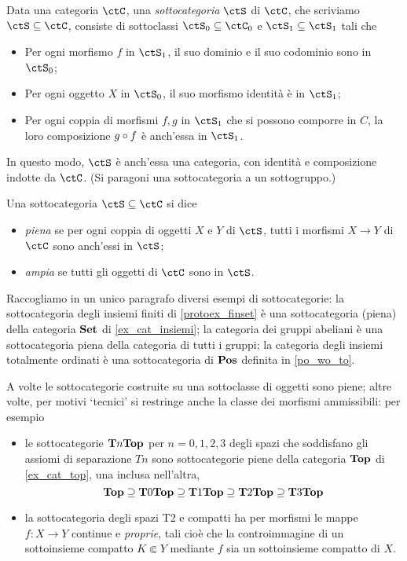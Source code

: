 \begin{definition}\label{def_subcat}
	Data una categoria \(\ctC\), una \emph{sottocategoria} \(\ctS\) di \(\ctC\), che scriviamo \(\ctS\subseteq \ctC\), consiste di sottoclassi \(\ctS_0\subseteq\ctC_0\) e \(\ctS_1\subseteq\ctS_1\) tali che
	\begin{itemize}
		\item Per ogni morfismo \(f\) in \(\ctS_1\), il suo dominio e il suo codominio sono in \(\ctS_0\);
		\item Per ogni oggetto \(X\) in \(\ctS_0\), il suo morfismo identità è in \(\ctS_1\);
		\item Per ogni coppia di morfismi \(f,g\) in \(\ctS_1\) che si possono comporre in \(C\), la loro composizione \(g\circ f\) è anch'essa in \(\ctS_1\).
	\end{itemize}
	In questo modo, \(\ctS\) è anch'essa una categoria, con identità e composizione indotte da \(\ctC\). (Si paragoni una sottocategoria a un sottogruppo.)

	Una sottocategoria \(\ctS\subseteq \ctC\) si dice
	\begin{itemize}
		\item \emph{piena} se per ogni coppia di oggetti \(X\) e \(Y\) di \(\ctS\), tutti i morfismi \(X\to Y\) di \(\ctC\) sono anch'essi in \(\ctS\);
    \item \emph{ampia} se tutti gli oggetti di \(\ctC\) sono in \(\ctS\).
	\end{itemize}
\end{definition}
\begin{example}
	Raccogliamo in un unico paragrafo diversi esempi di sottocategorie: la sottocategoria degli insiemi finiti di \ref{protoex_finset} è una sottocategoria (piena) della categoria \(\mathbf{Set}\) di \ref{ex_cat_insiemi}; la categoria dei gruppi abeliani è una sottocategoria piena della categoria di tutti i gruppi; la categoria degli insiemi totalmente ordinati è una sottocategoria di \(\mathbf{Pos}\) definita in \ref{po_wo_to}.

	A volte le sottocategorie costruite su una sottoclasse di oggetti sono piene; altre volte, per motivi `tecnici' si restringe anche la classe dei morfismi ammissibili: per esempio
	\begin{itemize}
		\item le sottocategorie \(\mathbf{T}n\mathbf{Top}\) per \(n=0,1,2,3\) degli spazi che soddisfano gli assiomi di separazione \(Tn\) sono sottocategorie piene della categoria \(\mathbf{Top}\) di \ref{ex_cat_top}, una inclusa nell'altra,
		      \[\mathbf{Top}\supseteq\mathbf{T}0\mathbf{Top}\supseteq\mathbf{T}1\mathbf{Top}\supseteq\mathbf{T}2\mathbf{Top}\supseteq\mathbf{T}3\mathbf{Top}\]
		\item la sottocategoria degli spazi T2 e compatti ha per morfismi le mappe \(f : X\to Y\) continue e \emph{proprie}, tali cioè che la controimmagine di un sottoinsieme compatto \(K\Subset Y\) mediante \(f\) sia un sottoinsieme compatto di \(X\).
	\end{itemize}
\end{example}
